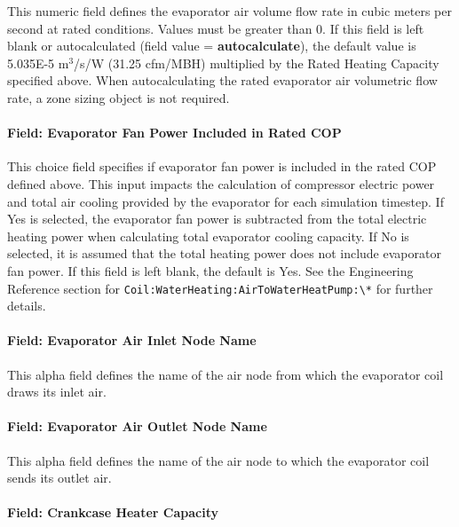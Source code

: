 This numeric field defines the evaporator air volume flow rate in cubic meters per second at rated conditions. Values must be greater than 0. If this field is left blank or autocalculated (field value = \textbf{autocalculate}), the default value is 5.035E-5 m\(^{3}\)/s/W (31.25 cfm/MBH) multiplied by the Rated Heating Capacity specified above. When autocalculating the rated evaporator air volumetric flow rate, a zone sizing object is not required.

\paragraph{Field: Evaporator Fan Power Included in Rated COP}\label{field-evaporator-fan-power-included-in-rated-cop-1}

This choice field specifies if evaporator fan power is included in the rated COP defined above. This input impacts the calculation of compressor electric power and total air cooling provided by the evaporator for each simulation timestep. If Yes is selected, the evaporator fan power is subtracted from the total electric heating power when calculating total evaporator cooling capacity. If No is selected, it is assumed that the total heating power does not include evaporator fan power. If this field is left blank, the default is Yes. See the Engineering Reference section for \lstinline!Coil:WaterHeating:AirToWaterHeatPump:\*! for further details.

\paragraph{Field: Evaporator Air Inlet Node Name}\label{field-evaporator-air-inlet-node-name-2}

This alpha field defines the name of the air node from which the evaporator coil draws its inlet air.

\paragraph{Field: Evaporator Air Outlet Node Name}\label{field-evaporator-air-outlet-node-name-1}

This alpha field defines the name of the air node to which the evaporator coil sends its outlet air.

\paragraph{Field: Crankcase Heater Capacity}\label{field-crankcase-heater-capacity-8}

